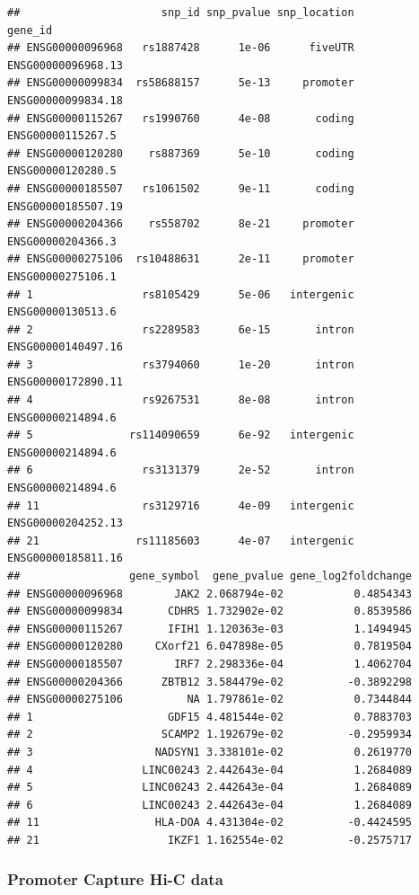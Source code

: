 \documentclass[9pt,a4paper,]{extarticle}
\begin{document}
\begin{verbatim}
##                      snp_id snp_pvalue snp_location            gene_id
## ENSG00000096968   rs1887428      1e-06      fiveUTR ENSG00000096968.13
## ENSG00000099834  rs58688157      5e-13     promoter ENSG00000099834.18
## ENSG00000115267   rs1990760      4e-08       coding  ENSG00000115267.5
## ENSG00000120280    rs887369      5e-10       coding  ENSG00000120280.5
## ENSG00000185507   rs1061502      9e-11       coding ENSG00000185507.19
## ENSG00000204366    rs558702      8e-21     promoter  ENSG00000204366.3
## ENSG00000275106  rs10488631      2e-11     promoter  ENSG00000275106.1
## 1                 rs8105429      5e-06   intergenic  ENSG00000130513.6
## 2                 rs2289583      6e-15       intron ENSG00000140497.16
## 3                 rs3794060      1e-20       intron ENSG00000172890.11
## 4                 rs9267531      8e-08       intron  ENSG00000214894.6
## 5               rs114090659      6e-92   intergenic  ENSG00000214894.6
## 6                 rs3131379      2e-52       intron  ENSG00000214894.6
## 11                rs3129716      4e-09   intergenic ENSG00000204252.13
## 21               rs11185603      4e-07   intergenic ENSG00000185811.16
##                 gene_symbol  gene_pvalue gene_log2foldchange
## ENSG00000096968        JAK2 2.068794e-02           0.4854343
## ENSG00000099834       CDHR5 1.732902e-02           0.8539586
## ENSG00000115267       IFIH1 1.120363e-03           1.1494945
## ENSG00000120280     CXorf21 6.047898e-05           0.7819504
## ENSG00000185507        IRF7 2.298336e-04           1.4062704
## ENSG00000204366      ZBTB12 3.584479e-02          -0.3892298
## ENSG00000275106          NA 1.797861e-02           0.7344844
## 1                     GDF15 4.481544e-02           0.7883703
## 2                    SCAMP2 1.192679e-02          -0.2959934
## 3                   NADSYN1 3.338101e-02           0.2619770
## 4                 LINC00243 2.442643e-04           1.2684089
## 5                 LINC00243 2.442643e-04           1.2684089
## 6                 LINC00243 2.442643e-04           1.2684089
## 11                  HLA-DOA 4.431304e-02          -0.4424595
## 21                    IKZF1 1.162554e-02          -0.2575717
\end{verbatim}

\subsubsection{Promoter Capture Hi-C data}\label{promoter-capture-hi-c-data}
\end{document}
